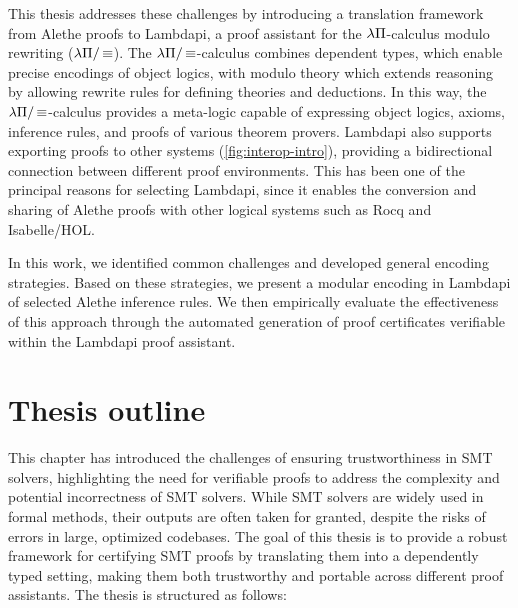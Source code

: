 This thesis addresses these challenges by introducing a translation framework from Alethe proofs to Lambdapi, a proof assistant for the $\lambda\Pi$-calculus modulo rewriting ($\lambda\Pi/\mathop{\equiv}$).
The $\lambda\Pi/\mathop{\equiv}$-calculus combines dependent types, which enable precise encodings of object logics, with modulo theory which extends reasoning by allowing rewrite rules for defining theories and deductions.
In this way, the $\lambda\Pi/\mathop{\equiv}$-calculus provides a meta-logic capable of expressing object logics, axioms, inference rules, and proofs of various theorem provers.
Lambdapi also supports exporting proofs to other systems (\cref{fig:interop-intro}), providing a bidirectional connection between different proof environments.
This has been one of the principal reasons for selecting Lambdapi, since it enables the conversion and sharing of Alethe proofs with other logical systems such as Rocq and Isabelle/HOL.

In this work, we identified common challenges and developed general encoding strategies.
Based on these strategies, we present a modular encoding in Lambdapi of selected Alethe inference rules.
We then empirically evaluate the effectiveness of this approach through the automated generation of proof certificates verifiable within the Lambdapi proof assistant.

\section{Thesis outline}
\label{sec:thesis-outline}

This chapter has introduced the challenges of ensuring trustworthiness in SMT solvers, highlighting the need for verifiable proofs to address the complexity and potential incorrectness of SMT solvers.
While SMT solvers are widely used in formal methods, their outputs are often taken for granted, despite the risks of errors in large, optimized codebases.
The goal of this thesis is to provide a robust framework for certifying SMT proofs by translating them into a dependently typed setting, making them both trustworthy and portable across different proof assistants.
The thesis is structured as follows:

